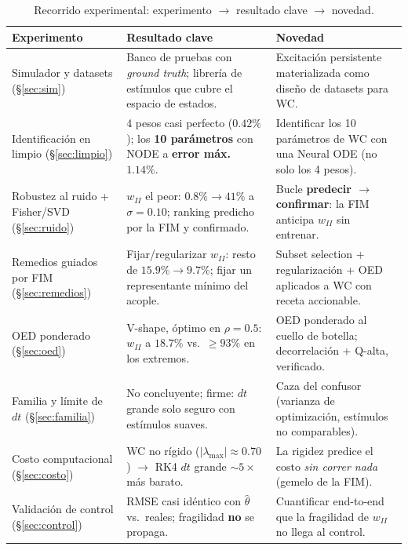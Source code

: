 \documentclass[11pt,a4paper]{article}
\begin{document}
\begin{table}[H]
\centering
\small
\begin{tabular}{@{}p{3.3cm} p{5.5cm} p{5.5cm}@{}}
\toprule
\textbf{Experimento} & \textbf{Resultado clave} & \textbf{Novedad} \\
\midrule
Simulador y datasets (\S\ref{sec:sim}) & Banco de pruebas con \emph{ground truth}; librería de estímulos que cubre el espacio de estados. & Excitación persistente materializada como diseño de datasets para WC. \\[4pt]
Identificación en limpio (\S\ref{sec:limpio}) & 4 pesos casi perfecto ($0.42\%$); los \textbf{10 parámetros} con NODE a \textbf{error máx.\ $1.14\%$}. & Identificar los 10 parámetros de WC con una Neural ODE (no solo los 4 pesos). \\[4pt]
Robustez al ruido + Fisher/SVD (\S\ref{sec:ruido}) & $w_{II}$ el peor: $0.8\%\to41\%$ a $\sigma=0.10$; ranking predicho por la FIM y confirmado. & Bucle \textbf{predecir $\to$ confirmar}: la FIM anticipa $w_{II}$ sin entrenar. \\[4pt]
Remedios guiados por FIM (\S\ref{sec:remedios}) & Fijar/regularizar $w_{II}$: resto de $15.9\%\to9.7\%$; fijar un representante mínimo del acople. & Subset selection + regularización + OED aplicados a WC con receta accionable. \\[4pt]
OED ponderado (\S\ref{sec:oed}) & V-shape, óptimo en $\rho=0.5$: $w_{II}$ a $18.7\%$ vs.\ $\ge93\%$ en los extremos. & OED ponderado al cuello de botella; decorrelación + Q-alta, verificado. \\[4pt]
Familia y límite de $dt$ (\S\ref{sec:familia}) & No concluyente; firme: $dt$ grande solo seguro con estímulos suaves. & Caza del confusor (varianza de optimización, estímulos no comparables). \\[4pt]
Costo computacional (\S\ref{sec:costo}) & WC no rígido ($|\lambda_{\max}|\approx0.70$) $\to$ RK4 $dt$ grande $\sim5\times$ más barato. & La rigidez predice el costo \emph{sin correr nada} (gemelo de la FIM). \\[4pt]
Validación de control (\S\ref{sec:control}) & RMSE casi idéntico con $\hat\theta$ vs.\ reales; fragilidad \textbf{no} se propaga. & Cuantificar end-to-end que la fragilidad de $w_{II}$ no llega al control. \\
\bottomrule
\end{tabular}
\caption{Recorrido experimental: experimento $\to$ resultado clave $\to$ novedad.}
\label{tab:resumen}
\end{table}
\end{document}

